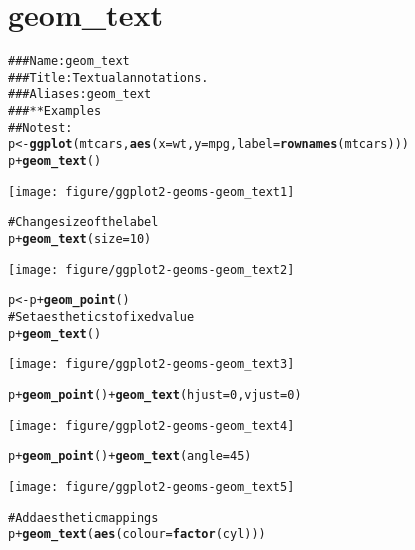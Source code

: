 \documentclass[a4paper,titlepage]{tufte-handout}\usepackage{graphicx, color}
\makeatletter
\def\maxwidth{ %
  \ifdim\Gin@nat@width>\linewidth
    \linewidth
  \else
    \Gin@nat@width
  \fi
}
\newcommand{\hlfunctioncall}[1]{\textcolor[rgb]{0.501960784313725,0,0.329411764705882}{\textbf{#1}}}%
\newcommand{\hlcomment}[1]{\textcolor[rgb]{0.180392156862745,0.6,0.341176470588235}{#1}}%
\newenvironment{kframe}{%
 \def\at@end@of@kframe{}%
 \ifinner\ifhmode%
  \def\at@end@of@kframe{\end{minipage}}%
  \begin{minipage}{\columnwidth}%
 \fi\fi%
 \def\FrameCommand##1{\hskip\@totalleftmargin \hskip-\fboxsep
 \colorbox{shadecolor}{##1}\hskip-\fboxsep
     \hskip-\linewidth \hskip-\@totalleftmargin \hskip\columnwidth}%
 \MakeFramed {\advance\hsize-\width
   \@totalleftmargin\z@ \linewidth\hsize
   \@setminipage}}%
 {\par\unskip\endMakeFramed%
 \at@end@of@kframe}
\newenvironment{knitrout}{}{} %
\makeatother
\begin{document}
\section{geom\_text}

\begin{knitrout}
\color{fgcolor}\begin{kframe}
\begin{alltt}
\hlcomment{### Name: geom_text}
\hlcomment{### Title: Textual annotations.}
\hlcomment{### Aliases: geom_text}
\hlcomment{### ** Examples}
\hlcomment{## No test: }
p <- \hlfunctioncall{ggplot}(mtcars, \hlfunctioncall{aes}(x=wt, y=mpg, label=\hlfunctioncall{rownames}(mtcars)))
p + \hlfunctioncall{geom_text}()
\end{alltt}
\end{kframe}\texttt{[image: figure/ggplot2-geoms-geom\_text1]} \begin{kframe}\begin{alltt}
\hlcomment{# Change size of the label}
p + \hlfunctioncall{geom_text}(size=10)
\end{alltt}
\end{kframe}\texttt{[image: figure/ggplot2-geoms-geom\_text2]} \begin{kframe}\begin{alltt}
p <- p + \hlfunctioncall{geom_point}()
\hlcomment{# Set aesthetics to fixed value}
p + \hlfunctioncall{geom_text}()
\end{alltt}
\end{kframe}\texttt{[image: figure/ggplot2-geoms-geom\_text3]} \begin{kframe}\begin{alltt}
p + \hlfunctioncall{geom_point}() + \hlfunctioncall{geom_text}(hjust=0, vjust=0)
\end{alltt}
\end{kframe}\texttt{[image: figure/ggplot2-geoms-geom\_text4]} \begin{kframe}\begin{alltt}
p + \hlfunctioncall{geom_point}() + \hlfunctioncall{geom_text}(angle = 45)
\end{alltt}
\end{kframe}\texttt{[image: figure/ggplot2-geoms-geom\_text5]} \begin{kframe}\begin{alltt}
\hlcomment{# Add aesthetic mappings}
p + \hlfunctioncall{geom_text}(\hlfunctioncall{aes}(colour=\hlfunctioncall{factor}(cyl)))

\end{alltt}
\end{kframe}
\end{knitrout}
\end{document}
